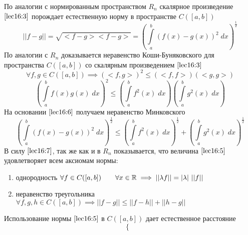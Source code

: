 \documentclass[../../main.tex]{subfiles}
\begin{document}
\begin{lemma}
\begin{lemma}
\begin{enumerate}
\end{enumerate}
	 По аналогии с нормированным пространством $R_n$ скалярное произведение
	  $\eqref{lec16:3}$ порождает естественную норму в пространстве $C(\left[a,
	   b\right])$
	 \begin{equation}
	 \label{lec16:5}
	 ||f - g|| = \sqrt{<f - g><f - g>} = \left(\int \limits_a^b (f(x) - g(x))^2
	  \; dx\right)^\frac{1}{2}
	 \end{equation}
	 По аналогии с $R_n$ доказывается неравенство Коши-Буняковского для 
	 пространства
	  $C(\left[a, b\right])$ со скалярным произведением $\eqref{lec16:3}$	
	 \[ \forall f, g \in C(\left[a, b\right]) \implies (<f, g>)^2 \leq (<f, 
	 f>)(<g, g>)\]
	 \begin{equation}
	\label{lec16:6}
	 \left(\int\limits_a^bf(x)g(x)\; dx\right)^2 \le \left(\int \limits_a^b
	  f^2(x)\; dx\right)\left(\int \limits_a^b g^2(x)\; dx\right) 
	 \end{equation}
	 На основании $\eqref{lec16:6}$ получаем неравенство Минковского
	 \begin{equation}
	 \label{lec16:7}
	  \left(\int\limits_a^b(f(x) - g(x))^2\; dx\right)^\frac{1}{2} \le \left(\int
	   \limits_a^b f^2(x)\; dx\right)^\frac{1}{2} + \left(\int \limits_a^b 
	   g^2(x)\; dx\right) ^ \frac{1}{2}
	 \end{equation}
	 В силу $\eqref{lec16:7}$, так же как и в $R_n$ показывается, что величина
	  $\eqref{lec16:5}$ удовлетворяет всем аксиомам нормы:
	 \begin{enumerate}
	  \\
	 $\forall f \in C(\left[a, b\right]) \implies ||f|| \geq 0$, причем $||f|| = 
	 0
	  \iff \begin{cases}
	 f(x) = 0\\\forall x \in \left[a, b\right]\\
	 \end{cases}$
	 	\item однородность
	 $\forall f \in C(\left[a, b\right]) \qquad \forall x \in \mathbb{R} \implies 
	 ||\lambda
	  f|| = |\lambda| \ ||f||$\\
	 \item неравенство треугольника
	 $\forall f, g, h \in C(\left[a, b\right]) \implies ||f - g|| \leq ||f - h|| 
	 + ||h - g||$
	 	\end{enumerate}
	 Использование нормы $\eqref{lec16:5}$ в $C(\left[a, b\right])$ дает 
	 естественное расстояние
	 \begin{equation}
	 \label{lec16:8}
	 \begin{cases}

\end{cases}
\end{equation}
\end{lemma}
\end{lemma}
\end{document}

